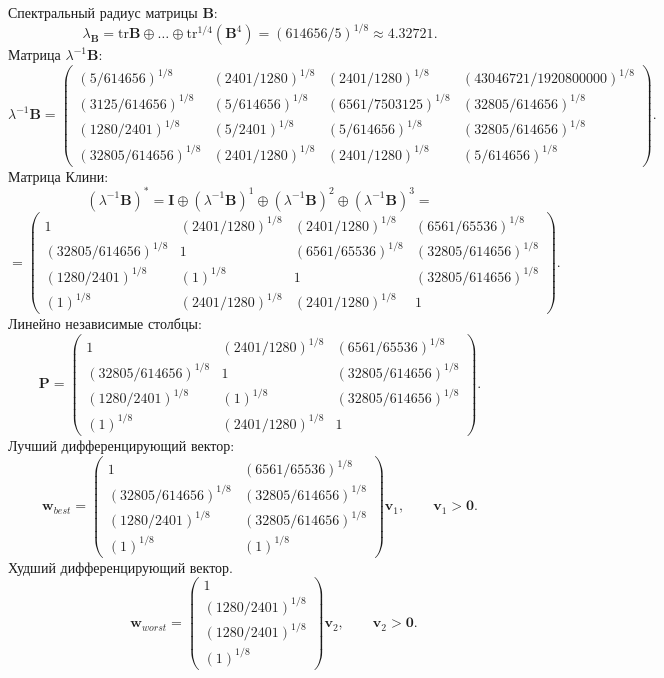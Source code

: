 Спектральный радиус матрицы $\bm{B}$:
$$\lambda_{\bm{B}} = \mathrm{tr}\bm{B}\oplus \dots \oplus \mathrm{tr}^{1/4}(\bm{B}^{4}) = (614656/5)^{1/8} \approx 4.32721.$$
Матрица $\lambda^{-1}\bm{B}$:
$$\lambda^{-1}\bm{B} = \begin{pmatrix}
(5/614656)^{1/8} & (2401/1280)^{1/8} & (2401/1280)^{1/8} & (43046721/1920800000)^{1/8}\\
(3125/614656)^{1/8} & (5/614656)^{1/8} & (6561/7503125)^{1/8} & (32805/614656)^{1/8}\\
(1280/2401)^{1/8} & (5/2401)^{1/8} & (5/614656)^{1/8} & (32805/614656)^{1/8}\\
(32805/614656)^{1/8} & (2401/1280)^{1/8} & (2401/1280)^{1/8} & (5/614656)^{1/8}
\end{pmatrix}.
$$
Матрица Клини:
$$(\lambda^{-1}\bm{B})^* = \bm{I} \oplus (\lambda^{-1}\bm{B})^1 \oplus (\lambda^{-1}\bm{B})^2 \oplus (\lambda^{-1}\bm{B})^3 = $$
$$ = \begin{pmatrix}
1 & (2401/1280)^{1/8} & (2401/1280)^{1/8} & (6561/65536)^{1/8}\\
(32805/614656)^{1/8} & 1 & (6561/65536)^{1/8} & (32805/614656)^{1/8}\\
(1280/2401)^{1/8} & (1)^{1/8} & 1 & (32805/614656)^{1/8}\\
(1)^{1/8} & (2401/1280)^{1/8} & (2401/1280)^{1/8} & 1
\end{pmatrix}.
$$
Линейно независимые столбцы:
$$\bm{P} = \begin{pmatrix}
1 & (2401/1280)^{1/8} & (6561/65536)^{1/8}\\
(32805/614656)^{1/8} & 1 & (32805/614656)^{1/8}\\
(1280/2401)^{1/8} & (1)^{1/8} & (32805/614656)^{1/8}\\
(1)^{1/8} & (2401/1280)^{1/8} & 1
\end{pmatrix}.
$$
Лучший дифференцирующий вектор:
$$\bm{w}_{best} = \begin{pmatrix}
1 & (6561/65536)^{1/8}\\
(32805/614656)^{1/8} & (32805/614656)^{1/8}\\
(1280/2401)^{1/8} & (32805/614656)^{1/8}\\
(1)^{1/8} & (1)^{1/8}
\end{pmatrix}\bm{v}_{1},
\qquad
\bm{v}_{1}
>
\bm{0}.
$$
Худший дифференцирующий вектор.
$$
\qquad \bm{w}_{worst} = \begin{pmatrix}
1\\
(1280/2401)^{1/8}\\
(1280/2401)^{1/8}\\
(1)^{1/8}
\end{pmatrix}\bm{v}_{2},
\qquad
\bm{v}_{2}
>
\bm{0}.
$$
